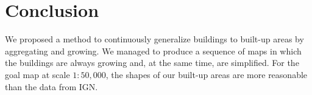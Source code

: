 %
%
%
%
%
%
%
%
%

\section{Conclusion}
\label{sec:Conclusion}

We proposed a method to continuously generalize buildings to built-up areas
by aggregating and growing.
We managed to produce a sequence of maps 
in which the buildings are always growing and, at the same time, are simplified.
For the goal map at scale $1:50{,}000$,
the shapes of our built-up areas are more reasonable than the data from IGN.

